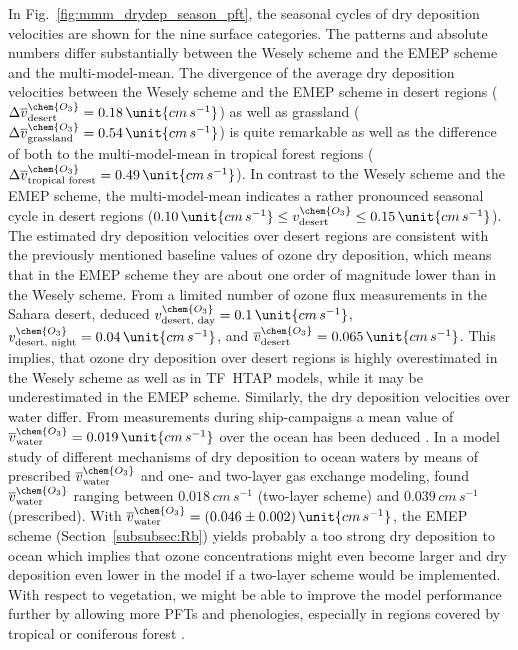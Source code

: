 \documentclass[gmd, manuscript]{copernicus}
\begin{document}
In Fig.~\ref{fig:mmm_drydep_season_pft}, the seasonal cycles of dry deposition velocities are shown for the nine surface categories. The patterns and absolute numbers differ substantially between the Wesely scheme and the EMEP scheme and the multi-model-mean. The divergence of the average dry deposition velocities between the Wesely scheme and the EMEP scheme in desert regions ($\Delta \overline{v}_\text{desert}^\chem{O_3} = 0.18\,\unit{cm\,s^{-1}}$) as well as grassland ($\Delta \overline{v}_\text{grassland}^\chem{O_3} = 0.54\,\unit{cm\,s^{-1}}$) is quite remarkable as well as the difference of both to the multi-model-mean in tropical forest regions ($\Delta \overline{v}_\text{tropical forest}^\chem{O_3} = 0.49\,\unit{cm\,s^{-1}}$). In contrast to the Wesely scheme and the EMEP scheme, the multi-model-mean indicates a rather pronounced seasonal cycle in desert regions ($0.10\,\unit{cm\,s^{-1}} \leq v^\chem{O_3}_\text{desert}\leq 0.15\,\unit{cm\,s^{-1}}$). The estimated dry deposition velocities over desert regions are consistent with the previously mentioned baseline values of ozone dry deposition, which means that in the EMEP scheme they are about one order of magnitude lower than in the Wesely scheme. From a limited number of ozone flux measurements in the Sahara desert, \citet{AE:Gusten1995} deduced $v^\chem{O_3}_\text{desert, day} = 0.1\,\unit{cm\,s^{-1}}$, $v^\chem{O_3}_\text{desert, night} = 0.04\,\unit{cm\,s^{-1}}$, and $\overline{v}^\chem{O_3}_\text{desert} = 0.065\,\unit{cm\,s^{-1}}$. This implies, that ozone dry deposition over desert regions is highly overestimated in the Wesely scheme as well as in TF~HTAP models, while it may be underestimated in the EMEP scheme. Similarly, the dry deposition velocities over water differ. From measurements during ship-campaigns a mean value of $\overline{v}^\chem{O_3}_\text{water} = 0.019\,\unit{cm\,s^{-1}}$ over the ocean has been deduced \citep{JGR:Helmig2012}. In a model study of different mechanisms of dry deposition to ocean waters by means of prescribed $\overline{v}_\text{water}^\chem{O_3}$ and one- and two-layer gas exchange modeling, \citet{ACP:Luhar2017} found $\overline{v}_\text{water}^\chem{O_3}$ ranging between $0.018\,\unit{cm\,s^{-1}}$ (two-layer scheme) and $0.039\,\unit{cm\,s^{-1}}$ (prescribed). With $\overline{v}^\chem{O_3}_\text{water} = (0.046\pm0.002)\,\unit{cm\,s^{-1}}$, the EMEP scheme (Section~\ref{subsubsec:Rb}) yields probably a too strong dry deposition to ocean which implies that ozone concentrations might even become larger and dry deposition even lower in the model if a two-layer scheme would be implemented. With respect to vegetation, we might be able to improve the model performance further by allowing more PFTs and phenologies, especially in regions covered by tropical or coniferous forest \citep{GCB:Anav2017}. 
\end{document}
